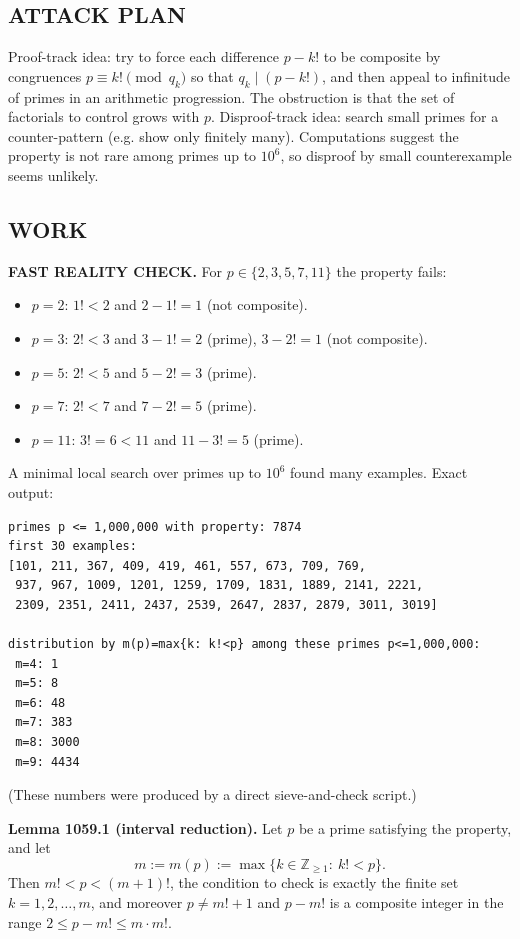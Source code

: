 \subsection*{ATTACK PLAN}
Proof-track idea: try to force each difference $p-k!$ to be composite by congruences $p\equiv k!\pmod{q_k}$ so that $q_k\mid (p-k!)$, and then appeal to infinitude of primes in an arithmetic progression. The obstruction is that the set of factorials to control grows with $p$.
Disproof-track idea: search small primes for a counter-pattern (e.g. show only finitely many). Computations suggest the property is not rare among primes up to $10^6$, so disproof by small counterexample seems unlikely.

\subsection*{WORK}
\textbf{FAST REALITY CHECK.}
For $p\in\{2,3,5,7,11\}$ the property fails:
\begin{itemize}
\item $p=2$: $1!<2$ and $2-1!=1$ (not composite).
\item $p=3$: $2!<3$ and $3-1!=2$ (prime), $3-2!=1$ (not composite).
\item $p=5$: $2!<5$ and $5-2!=3$ (prime).
\item $p=7$: $2!<7$ and $7-2!=5$ (prime).
\item $p=11$: $3!=6<11$ and $11-3!=5$ (prime).
\end{itemize}
A minimal local search over primes up to $10^6$ found many examples. Exact output:
\begin{verbatim}
primes p <= 1,000,000 with property: 7874
first 30 examples:
[101, 211, 367, 409, 419, 461, 557, 673, 709, 769,
 937, 967, 1009, 1201, 1259, 1709, 1831, 1889, 2141, 2221,
 2309, 2351, 2411, 2437, 2539, 2647, 2837, 2879, 3011, 3019]

distribution by m(p)=max{k: k!<p} among these primes p<=1,000,000:
 m=4: 1
 m=5: 8
 m=6: 48
 m=7: 383
 m=8: 3000
 m=9: 4434
\end{verbatim}
(These numbers were produced by a direct sieve-and-check script.)

\medskip
\textbf{Lemma 1059.1 (interval reduction).}
Let $p$ be a prime satisfying the property, and let
\[
m:=m(p):=\max\{k\in\mathbb Z_{\ge 1}:\ k!<p\}.
\]
Then $m!<p<(m+1)!$, the condition to check is exactly the finite set $k=1,2,\dots,m$, and moreover $p\neq m!+1$ and $p-m!$ is a composite integer in the range $2\le p-m!\le m\cdot m!$.

